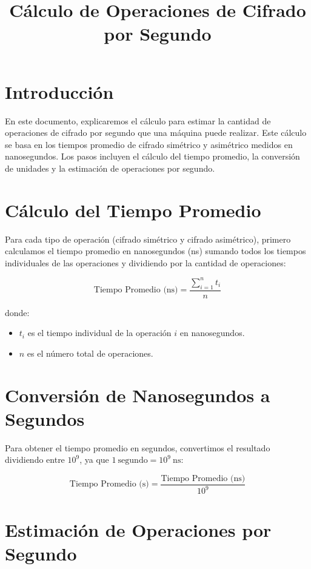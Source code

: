 \documentclass{article}
\title{Cálculo de Operaciones de Cifrado por Segundo}
\author{}
\date{}
\begin{document}
\maketitle

\section*{Introducción}
En este documento, explicaremos el cálculo para estimar la cantidad de operaciones de cifrado por segundo que una máquina puede realizar. Este cálculo se basa en los tiempos promedio de cifrado simétrico y asimétrico medidos en nanosegundos. Los pasos incluyen el cálculo del tiempo promedio, la conversión de unidades y la estimación de operaciones por segundo.

\section*{Cálculo del Tiempo Promedio}

Para cada tipo de operación (cifrado simétrico y cifrado asimétrico), primero calculamos el tiempo promedio en nanosegundos (\si{\nano\second}) sumando todos los tiempos individuales de las operaciones y dividiendo por la cantidad de operaciones:

\begin{equation}
    \text{Tiempo Promedio (ns)} = \frac{\sum_{i=1}^{n} t_i}{n}
\end{equation}

donde:
\begin{itemize}
    \item \( t_i \) es el tiempo individual de la operación \( i \) en nanosegundos.
    \item \( n \) es el número total de operaciones.
\end{itemize}

\section*{Conversión de Nanosegundos a Segundos}

Para obtener el tiempo promedio en segundos, convertimos el resultado dividiendo entre \( 10^9 \), ya que \( 1 \ \text{segundo} = 10^9 \ \si{\nano\second} \):

\begin{equation}
    \text{Tiempo Promedio (s)} = \frac{\text{Tiempo Promedio (ns)}}{10^9}
\end{equation}

\section*{Estimación de Operaciones por Segundo}
\end{document}
